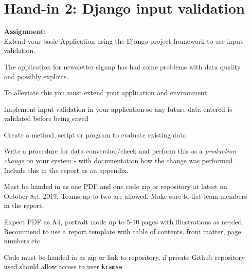 \documentclass[a4paper,11pt,notitlepage]{report}
\begin{document}
\chapter*{Hand-in 2: Django input validation}


{\bf Assignment:}\\
Extend your basic Application using the Django project framework to use input validation.

The application for newsletter signup has had some problems with data quality and possibly exploits.

To alleviate this you must extend your application and environment:
\begin{list2}
\item Implement input validation in your application so any future data entered is validated before being saved
\item Create a method, script or program to evaluate existing data
\item Write a procedure for data conversion/check and perform this as a \emph{production change} on your system - with documentation how the change was performed. Include this in the report as an appendix.
\end{list2}

Must be handed in as one PDF and one code zip or repository at latest on October 8st, 2019. Teams up to two are allowed. Make sure to list team members in the report.

Expect PDF as A4, portrait mode up to 5-10 pages with illustrations as needed.
Recommend to use a report template with table of contents, front matter, page numbers etc.

Code must be handed in as zip or link to repository, if private Github repository used should allow access to user \verb+kramse+
\end{document}
